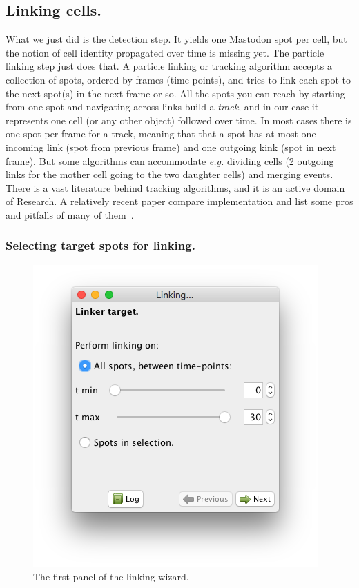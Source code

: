 \subsection{Linking cells.}
\label{sec:LinkingCells}

What we just did is the detection step. 
It yields one Mastodon spot per cell, but the notion of cell identity propagated over time is missing yet.
The particle linking step just does that.
A particle linking or tracking algorithm accepts a collection of spots, ordered by frames (time-points), and tries to link each spot to the next spot(s) in the next frame or so. 
All the spots you can reach by starting from one spot and navigating across links build a \textit{track}, and in our case it represents one cell (or any other object) followed over time. 
In most cases there is one spot per frame for a track, meaning that that a spot has at most one incoming link (spot from previous frame) and one outgoing kink (spot in next frame). 
But some algorithms can accommodate \textit{e.g.} dividing cells (2 outgoing links for the mother cell going to the two daughter cells) and merging events. There is a vast literature behind tracking algorithms, and it is an active domain of Research. A relatively recent paper compare implementation and list some pros and pitfalls of many of them~\cite{Chenouard2014}.

\subsubsection{Selecting target spots for linking.}
\label{sec:SelectingInputForLinking}

\begin{figure}
    \centering
    \includegraphics[height=0.3\textwidth,trim=0.5cm .5cm .5cm .5cm,clip]{figures/Mastodon_LinkingWizard_01.png}
    \caption{The first panel of the linking wizard.}
    \label{fig:LinkingWizardFirstPanel}
\end{figure}

